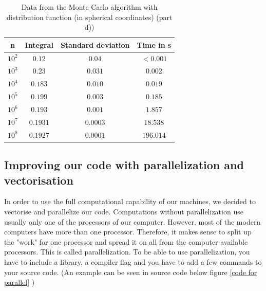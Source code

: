 \documentclass[10pt,a4paper]{article}
\begin{document}
\begin{table}[h]
\centering
\caption{Data from the Monte-Carlo algorithm with distribution function (in spherical coordinates) (part d))}
\label{Data from the  montecarlo algorithm (part d))}
\begin{tabular}{c|c|c|c}
n & Integral & Standard deviation & Time in s \\
\hline\hline
$10^2$ & $0.12$ & $0.04$ & $<0.001$\\
$10^3$ & $0.23$ & $0.031$ & $0.002$\\
$10^4$ & $0.183$ & $0.010$ & $0.019$\\
$10^5$ & $0.199$ & $0.003$ & $0.185$\\
$10^6$ & $0.193$ & $0.001$ & $1.857$\\
$10^7$ & $0.1931$ & $0.0003$ & $18.538$\\
$10^8$ & $0.1927$ & $0.0001$ & $196.014$\\
\end{tabular}
\end{table}

\subsection{Improving our code with parallelization and vectorisation}

In order to use the full computational capability of our machines, we decided to vectorise and parallelize our code. Computations without parallelization use usually only one of the processors of our computer. However, most of the modern computers have more than one processor. Therefore, it makes sense to split up the "work" for one processor and spread it on all from the computer available processors. This is called parallelization. To be able to use parallelization, you have to include a library, a compiler flag and you have to add a few commands to your source code. (An example can be seen in source code below figure \ref{code for parallel} )
\end{document}
